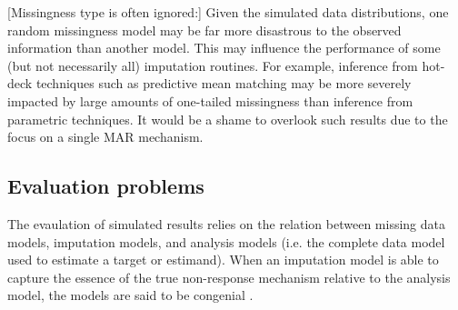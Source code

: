 \documentclass[bimj,fleqn]{w-art}
\begin{document}
[Missingness type is often ignored:] Given the simulated data distributions, one random missingness model may be far more disastrous to the observed information than another model. This may influence the performance of some (but not necessarily all) imputation routines. For example, inference from hot-deck techniques such as predictive mean matching \citep{little1988missing, rubin1986statistical} may be more severely impacted by large amounts of one-tailed missingness than inference from parametric techniques. It would be a shame to overlook such results due to the focus on a single MAR mechanism.



\subsection{Evaluation problems}



The evaulation of simulated results relies on the relation between missing data models, imputation models, and analysis models (i.e. the complete data model used to estimate a target or estimand). When an imputation model is able to capture the essence of the true non-response mechanism relative to the analysis model, the models are said to be congenial \citep{meng94}. 
\end{document}

